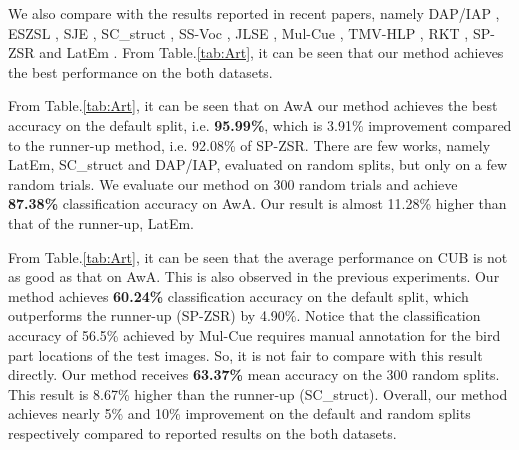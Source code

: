 \documentclass{article}
\begin{document}
We also compare with the results reported in recent papers, namely DAP/IAP \cite{lampert2014attribute}, ESZSL \cite{romera2015embarrassingly}, SJE \cite{akata2015evaluation}, SC\_struct \cite{changpinyo2016synthesized}, SS-Voc \cite{fu2016semi}, JLSE \cite{zhang2016zero}, Mul-Cue \cite{akata2016multi}, TMV-HLP \cite{fu2014transductive}, RKT \cite{wang2016relational}, SP-ZSR \cite{zhang2016SPZSL} and LatEm \cite{xian2016latent}. From Table.\ref{tab:Art}, it can be seen that our method achieves the best performance on the both datasets.

From Table.\ref{tab:Art}, it can be seen that on AwA our method achieves the best accuracy on the default split, i.e. \textbf{95.99\%}, which is 3.91\% improvement compared to the runner-up method, i.e. 92.08\% of SP-ZSR. There are few works, namely LatEm, SC\_struct and DAP/IAP, evaluated on random splits, but only on a few random trials. We evaluate our method on 300 random trials and achieve \textbf{87.38\%} classification accuracy on AwA. Our result is almost 11.28\% higher than that of the runner-up, LatEm.

From Table.\ref{tab:Art}, it can be seen that the average performance on CUB is not as good as that on AwA. This is also observed in the previous experiments. Our method achieves \textbf{60.24\%} classification accuracy on the default split, which outperforms the runner-up (SP-ZSR) by 4.90\%. Notice that the classification accuracy of 56.5\% achieved by Mul-Cue requires manual annotation for the bird part locations of the test images. So, it is not fair to compare with this result directly. Our method receives \textbf{63.37\%} mean accuracy on the 300 random splits. This result is 8.67\% higher than the runner-up (SC\_struct). Overall, our method achieves nearly 5\% and 10\% improvement on the default and random splits respectively compared to reported results on the both datasets.
\end{document}
